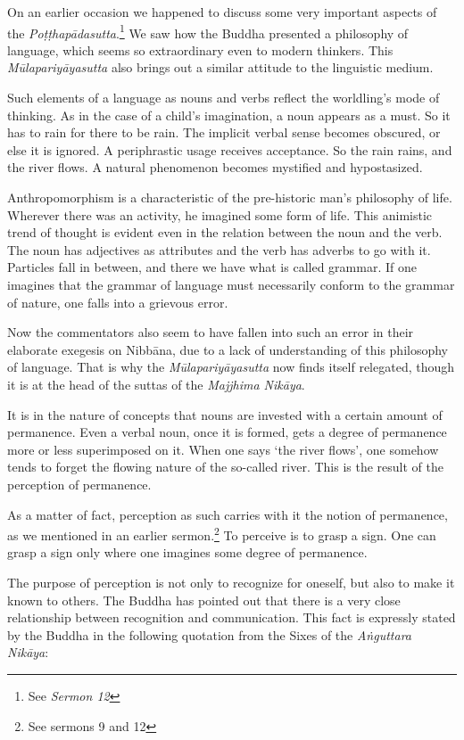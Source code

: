 On an earlier occasion we happened to discuss some very important aspects of the \emph{Poṭṭhapādasutta}.\footnote{See \emph{Sermon 12}} We saw how the Buddha presented a philosophy of language, which seems so extraordinary even to modern thinkers. This \emph{Mūlapariyāyasutta} also brings out a similar attitude to the linguistic medium.

Such elements of a language as nouns and verbs reflect the worldling's mode of thinking. As in the case of a child's imagination, a noun appears as a must. So it has to rain for there to be rain. The implicit verbal sense becomes obscured, or else it is ignored. A periphrastic usage receives acceptance. So the rain rains, and the river flows. A natural phenomenon becomes mystified and hypostasized.

Anthropomorphism is a characteristic of the pre-historic man's philosophy of life. Wherever there was an activity, he imagined some form of life. This animistic trend of thought is evident even in the relation between the noun and the verb. The noun has adjectives as attributes and the verb has adverbs to go with it. Particles fall in between, and there we have what is called grammar. If one imagines that the grammar of language must necessarily conform to the grammar of nature, one falls into a grievous error.

Now the commentators also seem to have fallen into such an error in their elaborate exegesis on Nibbāna, due to a lack of understanding of this philosophy of language. That is why the \emph{Mūlapariyāyasutta} now finds itself relegated, though it is at the head of the suttas of the \emph{Majjhima Nikāya}.

It is in the nature of concepts that nouns are invested with a certain amount of permanence. Even a verbal noun, once it is formed, gets a degree of permanence more or less superimposed on it. When one says `the river flows', one somehow tends to forget the flowing nature of the so-called river. This is the result of the perception of permanence.

As a matter of fact, perception as such carries with it the notion of permanence, as we mentioned in an earlier sermon.\footnote{See sermons 9 and 12} To perceive is to grasp a sign. One can grasp a sign only where one imagines some degree of permanence.

The purpose of perception is not only to recognize for oneself, but also to make it known to others. The Buddha has pointed out that there is a very close relationship between recognition and communication. This fact is expressly stated by the Buddha in the following quotation from the Sixes of the \emph{Aṅguttara Nikāya}:

